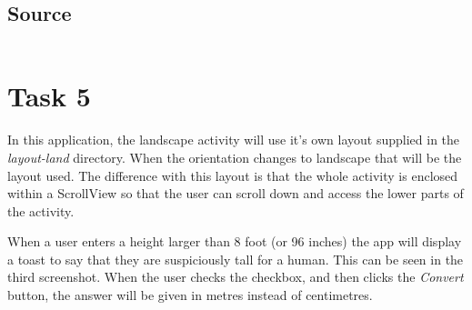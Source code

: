 \documentclass[11pt,english,numbers=endperiod,parskip=half]{scrartcl}
\begin{document}
\bigskip

\subsection{Source}
\inputminted{xml}{../../Apps/StrExtern/app/src/main/res/layout/activity_main.xml}

\section{Task 5}
\raggedright
In this application, the landscape activity will use it's own layout supplied in the \textit{layout-land} directory. When the orientation changes to landscape that will be the layout used. The difference with this layout is that the whole activity is enclosed within a ScrollView so that the user can scroll down and access the lower parts of the activity. 

When a user enters a height larger than 8 foot (or 96 inches) the app will display a toast to say that they are suspiciously tall for a human. This can be seen in the third screenshot. When the user checks the checkbox, and then clicks the \textit{Convert} button, the answer will be given in metres instead of centimetres.
\end{document}
